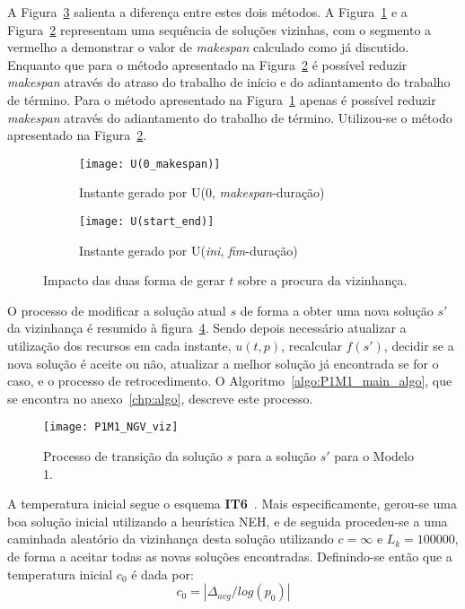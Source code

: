 A Figura~\ref{fig:dif_uniform} salienta a diferença entre estes dois métodos. A Figura~\ref{fig:U(0_makespan)} e a Figura~\ref{fig:U(start_end)} representam uma sequência de soluções vizinhas, com o segmento a vermelho a demonstrar o valor de \textit{makespan} calculado como já discutido. 
Enquanto que para o método apresentado na Figura~\ref{fig:U(start_end)} é possível reduzir \textit{makespan} através do atraso do trabalho de início e do adiantamento do trabalho de término. Para o método apresentado na Figura~\ref{fig:U(0_makespan)} apenas é possível reduzir \textit{makespan} através do adiantamento do trabalho de término. Utilizou-se o método apresentado na Figura~\ref{fig:U(start_end)}.\\
\begin{figure}[H]
	\centering
	\begin{subfigure}{0.49\textwidth}
	\centering
		\texttt{[image: U(0\_makespan)]}
		\caption{Instante gerado por U(0, \textit{makespan}-duração)}
		\label{fig:U(0_makespan)}
	\end{subfigure}
	\begin{subfigure}{0.49\textwidth}
	\centering
		\texttt{[image: U(start\_end)]}
		\caption{Instante gerado por U(\textit{ini}, \textit{fim}-duração)}
		\label{fig:U(start_end)}
	\end{subfigure}
	\caption{Impacto das duas forma de gerar $t$ sobre a procura da vizinhança.}
	\label{fig:dif_uniform}
\end{figure}

O processo de modificar a solução atual $s$ de forma a obter uma nova solução $s'$ da vizinhança é resumido à figura~\ref{fig:P1M1_NGV_viz}. Sendo depois necessário atualizar a utilização dos recursos em cada instante, $u(t,p)$, recalcular $f(s')$, decidir se a nova solução é aceite ou não, atualizar a melhor solução já encontrada se for o caso, e o processo de retrocedimento. O Algoritmo~\ref{algo:P1M1_main_algo}, que se encontra no anexo~\ref{chp:algo}, descreve este processo.\\
\begin{figure}[H]
	\centering
	\texttt{[image: P1M1\_NGV\_viz]}
	\caption{Processo de transição da solução $s$ para a solução $s'$ para o Modelo 1.}
	\label{fig:P1M1_NGV_viz}
\end{figure}

A temperatura inicial segue o esquema \textbf{IT6}~\cite{franzinRevisitingSimulatedAnnealing2019}. Mais especificamente, gerou-se uma boa solução inicial utilizando a heurística NEH, e de seguida procedeu-se a uma caminhada aleatório da vizinhança desta solução utilizando $c=\infty$ e $L_{k}=100000$, de forma a aceitar todas as novas soluções encontradas. Definindo-se então que a temperatura inicial $c_{0}$ é dada por:
$$c_{0}=|\Delta_{avg}/log(p_{0})|$$


